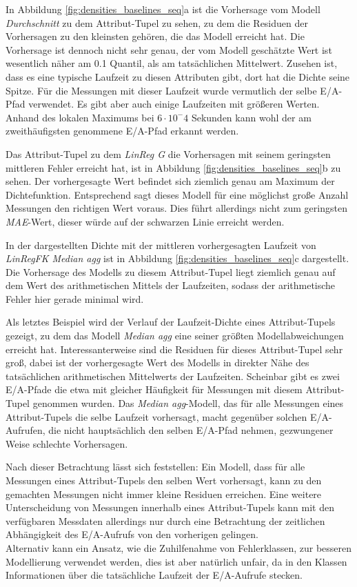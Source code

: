\documentclass[
	12pt,
	a4paper,
	BCOR10mm,
	DIV14,
	listof=totoc,
	bibliography=totoc,
	headsepline
]{scrreprt}
\begin{document}
In Abbildung \ref{fig:densities_baselines_seq}a ist die Vorhersage vom Modell \textit{Durchschnitt} zu dem Attribut-Tupel zu sehen, zu dem die Residuen der Vorhersagen zu den kleinsten gehören, die das Modell erreicht hat.
Die Vorhersage ist dennoch nicht sehr genau, der vom Modell geschätzte Wert ist wesentlich näher am 0.1 Quantil, als am tatsächlichen Mittelwert.
Zusehen ist, dass es eine typische Laufzeit zu diesen Attributen gibt, dort hat die Dichte seine Spitze. Für die Messungen mit dieser Laufzeit wurde vermutlich der selbe E/A-Pfad verwendet. Es gibt aber auch einige Laufzeiten mit größeren Werten.
Anhand des lokalen Maximums bei $6\cdot 10^-4$ Sekunden kann wohl der am zweithäufigsten genommene E/A-Pfad erkannt werden.\medskip

Das Attribut-Tupel zu dem \textit{LinReg G} die Vorhersagen mit seinem geringsten mittleren Fehler erreicht hat, ist in Abbildung \ref{fig:densities_baselines_seq}b zu sehen.
Der vorhergesagte Wert befindet sich ziemlich genau am Maximum der Dichtefunktion. Entsprechend sagt dieses Modell für eine möglichst große Anzahl Messungen den richtigen Wert voraus. Dies führt allerdings nicht zum geringsten \textit{MAE}-Wert, dieser würde auf der schwarzen Linie erreicht werden.\medskip
 
In der dargestellten Dichte mit der mittleren vorhergesagten Laufzeit von \textit{LinRegFK Median agg} ist in Abbildung \ref{fig:densities_baselines_seq}c dargestellt.
Die Vorhersage des Modells zu diesem Attribut-Tupel liegt ziemlich genau auf dem Wert des arithmetischen Mittels der Laufzeiten, sodass der arithmetische Fehler hier gerade minimal wird.\medskip

Als letztes Beispiel wird der Verlauf der Laufzeit-Dichte eines Attribut-Tupels gezeigt, zu dem das Modell \textit{Median agg} eine seiner größten Modellabweichungen erreicht hat.
Interessanterweise sind die Residuen für dieses Attribut-Tupel sehr groß, dabei ist der vorhergesagte Wert des Modells in direkter Nähe des tatsächlichen arithmetischen Mittelwerts der Laufzeiten.
Scheinbar gibt es zwei E/A-Pfade die etwa mit gleicher Häufigkeit für Messungen mit diesem Attribut-Tupel genommen wurden. 
Das \textit{Median agg}-Modell, das für alle Messungen eines Attribut-Tupels die selbe Laufzeit vorhersagt, macht gegenüber solchen E/A-Aufrufen, die nicht hauptsächlich den selben E/A-Pfad nehmen, gezwungener Weise schlechte Vorhersagen. \medskip

Nach dieser Betrachtung lässt sich feststellen:
Ein Modell, dass für alle Messungen eines Attribut-Tupels den selben Wert vorhersagt, kann zu den gemachten Messungen nicht immer kleine Residuen erreichen.
Eine weitere Unterscheidung von Messungen innerhalb eines Attribut-Tupels kann mit den verfügbaren Messdaten allerdings nur durch eine Betrachtung der zeitlichen Abhängigkeit des E/A-Aufrufs von den vorherigen gelingen.\\
Alternativ kann ein Ansatz, wie die Zuhilfenahme von Fehlerklassen, zur besseren Modellierung verwendet werden, dies ist aber natürlich \glqq unfair\grqq{}, da in den Klassen Informationen über die tatsächliche Laufzeit der E/A-Aufrufe stecken.
 
\end{document}

